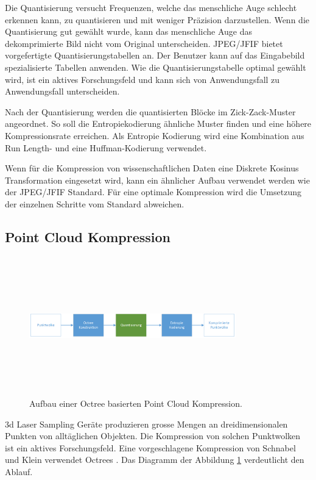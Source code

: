 Die Quantisierung versucht Frequenzen, welche das menschliche Auge schlecht erkennen kann, zu quantisieren und mit weniger Präzision darzustellen. Wenn die Quantisierung gut gewählt wurde, kann das menschliche Auge das dekomprimierte Bild nicht vom Original unterscheiden. JPEG/JFIF bietet vorgefertigte Quantisierungstabellen an. Der Benutzer kann auf das Eingabebild spezialisierte Tabellen anwenden. Wie die Quantisierungstabelle optimal gewählt wird, ist ein aktives Forschungsfeld \cite{wu1993rate:jpeg} \cite{wang2001designing:jpeg} und kann sich von Anwendungsfall zu Anwendungsfall unterscheiden.

Nach der Quantisierung werden die quantisierten Blöcke im Zick-Zack-Muster \cite{wallace1992jpeg} angeordnet. So soll die Entropiekodierung ähnliche Muster finden und eine höhere Kompressionsrate erreichen. Als Entropie Kodierung wird eine Kombination aus Run Length- \cite{wiki:rle} und eine Huffman-Kodierung \cite{huffman1952method} verwendet.

Wenn für die Kompression von wissenschaftlichen Daten eine Diskrete Kosinus Transformation eingesetzt wird, kann ein ähnlicher Aufbau verwendet werden wie der JPEG/JFIF Standard. Für eine optimale Kompression wird die Umsetzung der einzelnen Schritte vom Standard abweichen.

\subsection{Point Cloud Kompression} \label{state:pointcloud}
\begin{figure}[!htbp]
	\center
	\includegraphics[width=0.8\textwidth,height=6cm,keepaspectratio]{./pictures/state/pointcloud.png}
	\caption{Aufbau einer Octree basierten Point Cloud Kompression.}
	\label{state:pointcloud:abb}
\end{figure}
3d Laser Sampling Geräte produzieren grosse Mengen an dreidimensionalen Punkten von alltäglichen Objekten. Die Kompression von solchen Punktwolken ist ein aktives Forschungsfeld. Eine vorgeschlagene Kompression  von Schnabel und Klein \cite{schnabel2006octree} verwendet Octrees \cite{wiki:octree}. Das Diagramm der Abbildung \ref{state:pointcloud:abb} verdeutlicht den Ablauf.

